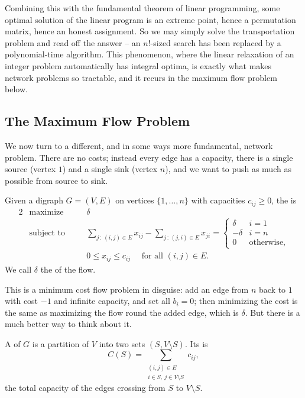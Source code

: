 Combining this with the fundamental theorem of linear programming, some optimal solution of the linear program is an extreme point, hence a permutation matrix, hence an honest assignment. So we may simply solve the transportation problem and read off the answer -- an $n!$-sized search has been replaced by a polynomial-time algorithm. This phenomenon, where the linear relaxation of an integer problem automatically has integral optima, is exactly what makes network problems so tractable, and it recurs in the maximum flow problem below.

\subsection{The Maximum Flow Problem}

We now turn to a different, and in some ways more fundamental, network problem. There are no costs; instead every edge has a capacity, there is a single source (vertex $1$) and a single sink (vertex $n$), and we want to push as much as possible from source to sink.

\begin{definition}
    Given a digraph $G = (V,E)$ on vertices $\{1, \dots, n\}$ with capacities $c_{ij} \geq 0$, the  is
    \begin{alignat*}{2}
        & \text{maximize} \quad && \delta \\
        & \text{subject to} \quad && \sum_{j\,:\,(i,j)\in E}x_{ij} - \sum_{j\,:\,(j,i)\in E}x_{ji} = \begin{cases}\delta & i = 1\\ -\delta & i = n\\ 0 & \text{otherwise},\end{cases}\\
        & && 0 \leq x_{ij} \leq c_{ij} \quad \text{ for all } (i,j)\in E.
    \end{alignat*}
    We call $\delta$ the  of the flow.
\end{definition}

This is a minimum cost flow problem in disguise: add an edge from $n$ back to $1$ with cost $-1$ and infinite capacity, and set all $b_i = 0$; then minimizing the cost is the same as maximizing the flow round the added edge, which is $\delta$. But there is a much better way to think about it.

\begin{definition}[Cut]
    A  of $G$ is a partition of $V$ into two sets $(S, V\setminus S)$. Its  is
    $$
    C(S) = \sum_{\substack{(i,j) \in E \\ i \in S,\ j \in V\setminus S}} c_{ij},
    $$
    the total capacity of the edges crossing from $S$ to $V\setminus S$.
\end{definition}

